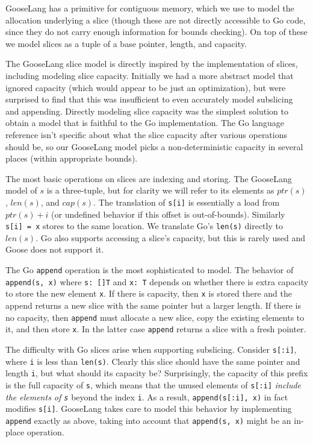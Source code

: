 GooseLang has a primitive for contiguous memory, which we use to model
the allocation underlying a slice (though these are not directly
accessible to Go code, since they do not carry enough information for
bounds checking). On top of these we model slices as a tuple of a base
pointer, length, and capacity.

The GooseLang slice model is directly inspired by the implementation of
slices, including modeling slice capacity. Initially we had a more
abstract model that ignored capacity (which would appear to be just an
optimization), but were surprised to find that this was insufficient to
even accurately model subslicing and appending. Directly modeling slice
capacity was the simplest solution to obtain a model that is faithful to
the Go implementation. The Go language reference isn't specific about
what the slice capacity after various operations should be, so our
GooseLang model picks a non-deterministic capacity in several places
(within appropriate bounds).

The most basic operations on slices are indexing and storing. The
GooseLang model of \(s\) is a three-tuple, but for clarity we will refer
to its elements as \(ptr(s)\), \(len(s)\), and \(cap(s)\). The
translation of \texttt{s{[}i{]}} is essentially a load from
\(ptr(s) + i\) (or undefined behavior if this offset is out-of-bounds).
Similarly \texttt{s{[}i{]}\ =\ x} stores to the same location. We
translate Go's \texttt{len(s)} directly to \(len(s)\). Go also supports
accessing a slice's capacity, but this is rarely used and Goose does not
support it.

The Go \texttt{append} operation is the most sophisticated to model. The
behavior of \texttt{append(s,\ x)} where \texttt{s:\ {[}{]}T} and
\texttt{x:\ T} depends on whether there is extra capacity to store the
new element \texttt{x}. If there is capacity, then \texttt{x} is stored
there and the append returns a new slice with the same pointer but a
larger length. If there is no capacity, then \texttt{append} must
allocate a new slice, copy the existing elements to it, and then store
\texttt{x}. In the latter case \texttt{append} returns a slice with a
fresh pointer.

The difficulty with Go slices arise when supporting subslicing. Consider
\texttt{s{[}:i{]}}, where \texttt{i} is less than \texttt{len(s)}.
Clearly this slice should have the same pointer and length \texttt{i},
but what should its capacity be? Surprisingly, the capacity of this
prefix is the full capacity of \texttt{s}, which means that the unused
elements of \texttt{s{[}:i{]}} \emph{include the elements of \texttt{s}}
beyond the index \texttt{i}. As a result, \texttt{append(s{[}:i{]},\ x)}
in fact modifies \texttt{s{[}i{]}}. GooseLang takes care to model this
behavior by implementing \texttt{append} exactly as above, taking into
account that \texttt{append(s,\ x)} might be an in-place operation.

